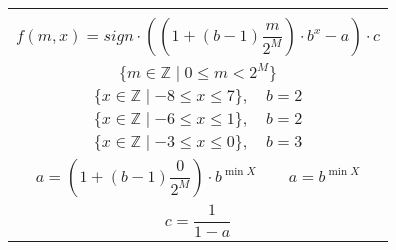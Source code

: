 \documentclass[12pt]{standalone}
\begin{document}
    \begin{minipage}{9cm}

        \begin{tabular}{|c|}
        \hline
        \\

            \vbox{\begin{equation*}
            f(m, x) = sign \cdot ((1 + (b - 1) \frac{m}{2^{M}}) \cdot b^{x} - a) \cdot c
            \end{equation*}}

        \\

            \vbox{\begin{equation*}
            \{ m \in \mathbb{Z} \mid 0 \leq m < 2^{M} \}
            \end{equation*}}

        \\

            \vbox{\begin{equation*}\tag{4 bits}
            \{ x \in \mathbb{Z} \mid -8 \leq x \leq 7 \},
            \quad
            b = 2
            \end{equation*}}

        \\

            \vbox{\begin{equation*}\tag{3 bits}
            \{ x \in \mathbb{Z} \mid -6 \leq x \leq 1 \},
            \quad
            b = 2
            \end{equation*}}

        \\

            \vbox{\begin{equation*}\tag{2 bits}
            \{ x \in \mathbb{Z} \mid -3 \leq x \leq 0 \},
            \quad
            b = 3
            \end{equation*}}

        \\

            \vbox{\begin{equation*}
            a = (1 + (b - 1) \frac{0}{2^{M}}) \cdot b^{\min{X}}
            \quad \quad
            a = b^{\min{X}}
            \end{equation*}}

        \\

            \vbox{\begin{equation*}
            c = \frac{1}{1 - a}
            \end{equation*}}

        \\
        \hline
        \end{tabular}

    \end{minipage}
\end{document}
